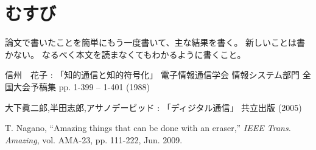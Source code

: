 \documentclass[12pt]{jreport}
\begin{document}
\chapter{むすび}
論文で書いたことを簡単にもう一度書いて、主な結果を書く。
新しいことは書かない。
なるべく本文を読まなくてもわかるように書くこと。


\bunken
\begin{thebibliography}{99}
    信州　花子 : 「知的通信と知的符号化」
    電子情報通信学会 情報システム部門 全国大会予稿集
    pp. 1-399 -- 1-401 (1988)

    大下眞二郎,半田志郎,アサノデービッド : 「ディジタル通信」 共立出版 (2005)

    T. Nagano, ``Amazing things that can be done with an eraser,''
    \emph{IEEE Trans. Amazing}, vol. AMA-23, pp. 111-222, Jun. 2009.
\end{thebibliography}
\end{document}
